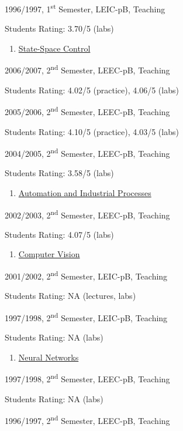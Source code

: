 \documentclass[
]{article}
\begin{document}
1996/1997, 1\textsuperscript{st} Semester, LEIC-pB, Teaching

Students Rating: 3.70/5 (labs)

\begin{enumerate}
\def\labelenumi{\arabic{enumi}.}
\setcounter{enumi}{8}
\item
  \ul{State-Space Control}
\end{enumerate}

2006/2007, 2\textsuperscript{nd} Semester, LEEC-pB, Teaching

Students Rating: 4.02/5 (practice), 4.06/5 (labs)

2005/2006, 2\textsuperscript{nd} Semester, LEEC-pB, Teaching

Students Rating: 4.10/5 (practice), 4.03/5 (labs)

2004/2005, 2\textsuperscript{nd} Semester, LEEC-pB, Teaching

Students Rating: 3.58/5 (labs)

\begin{enumerate}
\def\labelenumi{\arabic{enumi}.}
\setcounter{enumi}{9}
\item
  \ul{Automation and Industrial Processes}
\end{enumerate}

2002/2003, 2\textsuperscript{nd} Semester, LEEC-pB, Teaching

Students Rating: 4.07/5 (labs)

\begin{enumerate}
\def\labelenumi{\arabic{enumi}.}
\setcounter{enumi}{10}
\item
  \ul{Computer Vision}
\end{enumerate}

2001/2002, 2\textsuperscript{nd} Semester, LEIC-pB, Teaching

Students Rating: NA (lectures, labs)

1997/1998, 2\textsuperscript{nd} Semester, LEIC-pB, Teaching

Students Rating: NA (labs)

\begin{enumerate}
\def\labelenumi{\arabic{enumi}.}
\setcounter{enumi}{11}
\item
  \ul{Neural Networks}
\end{enumerate}

1997/1998, 2\textsuperscript{nd} Semester, LEEC-pB, Teaching

Students Rating: NA (labs)

1996/1997, 2\textsuperscript{nd} Semester, LEEC-pB, Teaching
\end{document}
